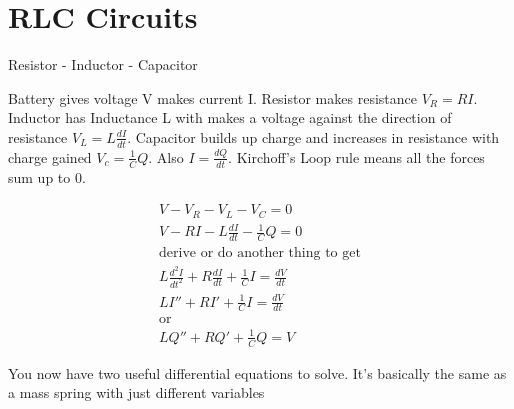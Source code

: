 \documentclass[fleqn]{report}
\newcommand{\comment}[1]{}
\newcommand{\equations} [1] {
\begin{gather*}
#1
\end{gather*}
}
\begin{document}
 
 \comment{
 
 \section{Free Damped Oscillator}
 \[
 r = \frac{\gamma \pm \sqrt{\gamma^2 - 4mk}}{2m}
 \]
 
 im not paying attention
 
 WATCH LECTURE LATER PLEASE PLEASE PLEASE PLEASE PLEASE PLEASE
 \[
 C = \frac{F/m (\omega_0^2 - \omega)}{(\omega_0 - \omega^2) \ldots}
 \]
 
 somethosnegabdlgas
 
 \section{Complexification}
 \equations{
m x'' + kx = F \cos (\omega t)
\\
e^{i \omega t} = \cos (\omega t) + i \sin (\omega t)
\\
\cos (\omega t) = \textrm{Re} (e^{i \omega t})
\\
m x'' + kx = \textrm{Re} (Fe^{i \omega t})
\\
\widetilde{x} \in \mathbb{C}
\\
m x'' + kx = \textrm{Re} (\widetilde{x})
\\
\Re m \widetilde{x}'' + kx 
 }
 
 WATCH THE LECTURE AHHHHHHHHHHHHH
 
 }

\section{RLC Circuits}
Resistor - Inductor - Capacitor

Battery gives voltage V makes current I. Resistor makes resistance $V_R = RI$. Inductor has Inductance L with makes a voltage against the direction of resistance $V_L = L \frac{dI}{dt}$. Capacitor builds up charge and increases in resistance with charge gained $V_c = \frac{1}{C} Q$. Also $I = \frac{dQ}{dt}$. Kirchoff's Loop rule means all the forces sum up to 0.

\equations{
V - V_R - V_L - V_C = 0
\\
V - RI - L \frac{dI}{dt} - \frac{1}{C} Q = 0
\\
\textrm{derive or do another thing to get}
\\
L \frac{d^2 I}{dt^2 } + R\frac{dI}{dt} + \frac{1}{C}I = \frac{dV}{dt}
\\
L I'' + R I' + \frac{1}{C}I = \frac{dV}{dt}
\\
\textrm{or}
\\
L Q''  + R Q' + \frac{1}{C} Q = V
}
You now have two useful differential equations to solve. It's basically the same as a mass spring with just different variables
\end{document}
